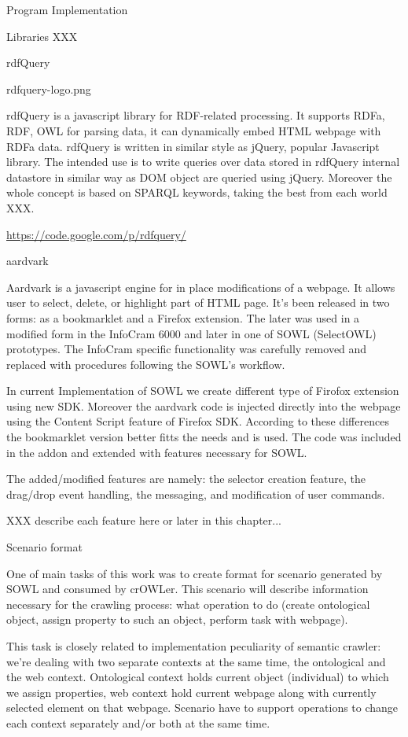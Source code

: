  
\chap Program Implementation

\sec Libraries XXX

\secc rdfQuery

\picw=1cm \cinspic rdfquery-logo.png

rdfQuery is a javascript library for RDF-related processing. It supports RDFa,
RDF, OWL for parsing data, it can dynamically embed HTML webpage with RDFa
data. rdfQuery is written in similar style as jQuery, popular Javascript
library. The intended use is to write queries over data stored in rdfQuery
internal datastore in similar way as DOM object are queried using jQuery.
Moreover the whole concept is based on SPARQL keywords, taking the best from
each world XXX. 

\url{https://code.google.com/p/rdfquery/}


\secc aardvark

Aardvark is a javascript engine for in place modifications of a webpage. It
allows user to select, delete, or highlight part of HTML page. It's been
released in two forms: as a bookmarklet and a Firefox extension. The later was
used in a modified form in the InfoCram 6000 and later in one of SOWL
(SelectOWL) prototypes. The InfoCram specific functionality was carefully 
removed and replaced with procedures following the SOWL's workflow. 

In current Implementation of SOWL we create different type of Firofox extension
using new SDK. Moreover the aardvark code is injected directly into the webpage
using the Content Script feature of Firefox SDK. According to these differences
the bookmarklet version better fitts the needs and is used. The code was included
in the addon and extended with features necessary for SOWL. 

The added/modified features are namely: the selector creation feature, the
drag/drop event handling, the messaging, and modification of user commands. 

XXX describe each feature here or later in this chapter...

\sec Scenario format

One of main tasks of this work was to create format for scenario generated by
SOWL and consumed by crOWLer. This scenario will describe information necessary
for the crawling process: what operation to do (create ontological object,
assign property to such an object, perform task with webpage). 

This task is closely related to implementation peculiarity of semantic crawler:
we're dealing with two separate contexts at the same time, the ontological and
the web context. Ontological context holds current object (individual) to which
we assign properties, web context hold current webpage along with currently
selected element on that webpage. Scenario have to support operations to change
each context separately and/or both at the same time. 



